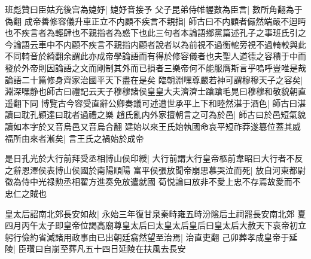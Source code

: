班彪贊曰臣姑充後宫為媫妤|{
	媫妤音接予}
父子昆弟侍帷幄數為臣言|{
	數所角翻為于偽翻}
成帝善修容儀升車正立不内顧不疾言不親指|{
	師古曰不内顧者儼然端嚴不迴眄也不疾言者為輕肆也不親指者為惑下也此三句者本論語鄉黨篇述孔子之事班氏引之今論語云車中不内顧不疾言不親指内顧者說者以為前視不過衡軶旁視不過輢較與此不同輢音於綺翻余謂此亦成帝學論語而有得於修容儀者也夫聖人道德之容積于中而發於外帝則因論語之文而剛制其外而已損者三樂帝何不能服膺斯言乎嗚呼豈唯是哉論語二十篇修身齊家治國平天下盡在是矣}
臨朝淵嘿尊嚴若神可謂穆穆天子之容矣|{
	淵深嘿静也師古曰禮記云天子穆穆諸侯皇皇大夫濟濟士蹌蹌毛晃曰穆穆和敬貌朝直遥翻下同}
博覽古今容受直辭公卿奏議可述遭世承平上下和睦然湛于酒色|{
	師古曰湛讀曰耽孔穎達曰耽者過禮之樂}
趙氏亂内外家擅朝言之可為於邑|{
	師古曰於邑短氣貌讀如本字於又音烏邑又音烏合翻}
建始以來王氏始執國命哀平短祚莽遂簒位蓋其威福所由來者漸矣|{
	言王氏之禍始於成帝}


是日孔光於大行前拜受丞相博山侯印綬|{
	大行前謂大行皇帝柩前韋昭曰大行者不反之辭恩澤侯表博山侯國於南陽順陽}
富平侯張放聞帝崩思慕哭泣而死|{
	放自河東都尉徵為侍中光禄勲丞相翟方進奏免放遣就國}
荀悦論曰放非不愛上忠不存焉故愛而不忠仁之賊也

皇太后詔南北郊長安如故|{
	永始三年復甘泉秦畤雍五畤汾隂后土祠罷長安南北郊}
夏四月丙午太子即皇帝位謁高廟尊皇太后曰太皇太后皇后曰皇太后大赦天下哀帝初立躬行儉約省減諸用政事由已出朝廷翕然望至治焉|{
	治直吏翻}
己卯葬孝成皇帝于延陵|{
	臣瓚曰自崩至葬凡五十四日延陵在扶風去長安}


